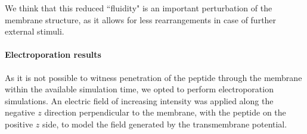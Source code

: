 We think that this reduced ``fluidity" is an important perturbation of the membrane structure, as it allows for less rearrangements in case of further external stimuli.



\paragraph{Electroporation results}

As it is not possible to witness penetration of the peptide through the membrane within the available simulation time, we opted to perform electroporation simulations.
%
An electric field of increasing intensity was applied along the negative $z$ direction perpendicular to the membrane, with the peptide on the positive $z$ side, to model the field generated by the transmembrane potential.
%

